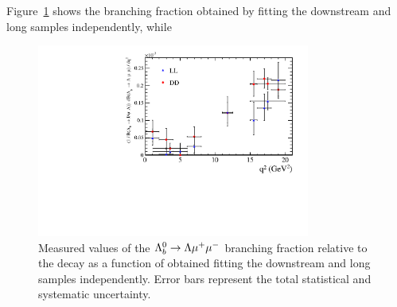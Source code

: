 Figure~\ref{fig:corrDDLLplots} shows the branching fraction obtained by fitting 
the downstream and long samples independently, while
%
\begin{figure}
\centering
\includegraphics[width=0.8\textwidth]{Lmumu/figs/q2result_both.pdf}
\caption{Measured values of the $\Lambda^0_b\rightarrow\Lambda\mu^+\mu^-$ branching fraction relative
to the \Lb\to\jpsi\Lz decay as a function of \qsq
obtained fitting the downstream and long samples independently.
Error bars represent the total statistical and systematic uncertainty.}
\label{fig:corrDDLLplots}
\end{figure}
%
%
%
%
%
%
